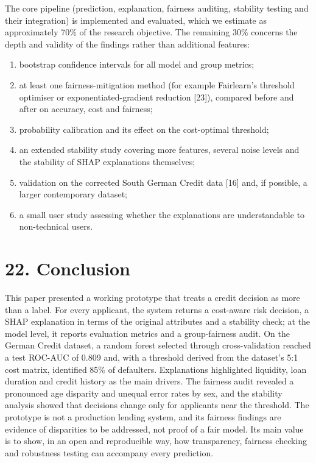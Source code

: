 \documentclass[
  11pt,
]{article}
\providecommand{\tightlist}{%
  \setlength{\itemsep}{0pt}\setlength{\parskip}{0pt}}
\begin{document}
The core pipeline (prediction, explanation, fairness auditing, stability
testing and their integration) is implemented and evaluated, which we
estimate as approximately 70\% of the research objective. The remaining
30\% concerns the depth and validity of the findings rather than
additional features:

\begin{enumerate}
\def\labelenumi{\arabic{enumi}.}
\tightlist
\item
  bootstrap confidence intervals for all model and group metrics;
\item
  at least one fairness-mitigation method (for example Fairlearn's
  threshold optimiser or exponentiated-gradient reduction {[}23{]}),
  compared before and after on accuracy, cost and fairness;
\item
  probability calibration and its effect on the cost-optimal threshold;
\item
  an extended stability study covering more features, several noise
  levels and the stability of SHAP explanations themselves;
\item
  validation on the corrected South German Credit data {[}16{]} and, if
  possible, a larger contemporary dataset;
\item
  a small user study assessing whether the explanations are
  understandable to non-technical users.
\end{enumerate}

\hypertarget{conclusion}{%
\section{22. Conclusion}\label{conclusion}}

This paper presented a working prototype that treats a credit decision
as more than a label. For every applicant, the system returns a
cost-aware risk decision, a SHAP explanation in terms of the original
attributes and a stability check; at the model level, it reports
evaluation metrics and a group-fairness audit. On the German Credit
dataset, a random forest selected through cross-validation reached a
test ROC-AUC of 0.809 and, with a threshold derived from the dataset's
5:1 cost matrix, identified 85\% of defaulters. Explanations highlighted
liquidity, loan duration and credit history as the main drivers. The
fairness audit revealed a pronounced age disparity and unequal error
rates by sex, and the stability analysis showed that decisions change
only for applicants near the threshold. The prototype is not a
production lending system, and its fairness findings are evidence of
disparities to be addressed, not proof of a fair model. Its main value
is to show, in an open and reproducible way, how transparency, fairness
checking and robustness testing can accompany every prediction.
\end{document}
